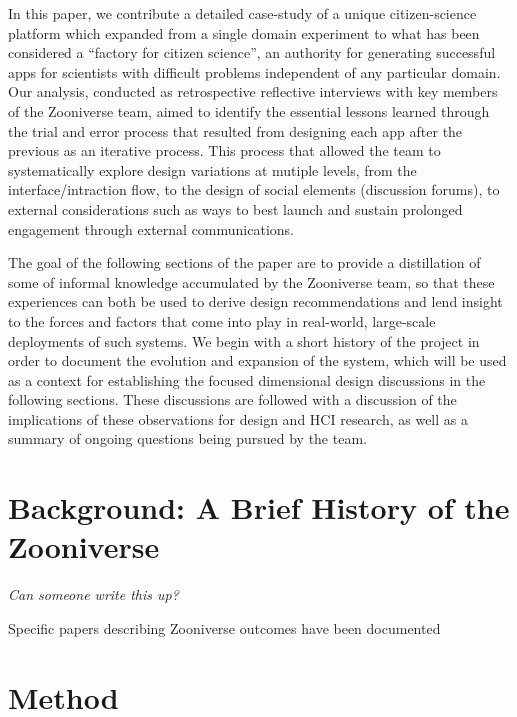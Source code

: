\documentclass{sigchi}
\begin{document}
In this paper, we contribute a detailed case-study of a unique
citizen-science platform which expanded from a single domain
experiment to what has been considered a ``factory for citizen
science'', an authority for generating successful apps for scientists
with difficult problems independent of any particular domain.  Our
analysis, conducted as retrospective reflective interviews with key
members of the Zooniverse team, aimed to identify the essential
lessons learned through the trial and error process that resulted from
designing each app after the previous as an iterative process.  This
process that allowed the team to systematically explore design
variations at mutiple levels, from the interface/intraction flow, to
the design of social elements (discussion forums), to external
considerations such as ways to best launch and sustain prolonged
engagement through external communications.

The goal of the following sections of the paper are to provide a
distillation of some of informal knowledge accumulated by the
Zooniverse team, so that these experiences can both be used to derive
design recommendations and lend insight to the forces and factors that
come into play in real-world, large-scale deployments of such systems.
We begin with a short history of the project in order to document the
evolution and expansion of the system, which will be used as a context
for establishing the focused dimensional design discussions in the
following sections.  These discussions are followed with a discussion
of the implications of these observations for design and HCI research,
as well as a summary of ongoing questions being pursued by the team.

\section{Background: A Brief History of the Zooniverse}

\emph{Can someone write this up?}


Specific papers describing Zooniverse outcomes have been
documented \cite{}

\section{Method}
\end{document}

